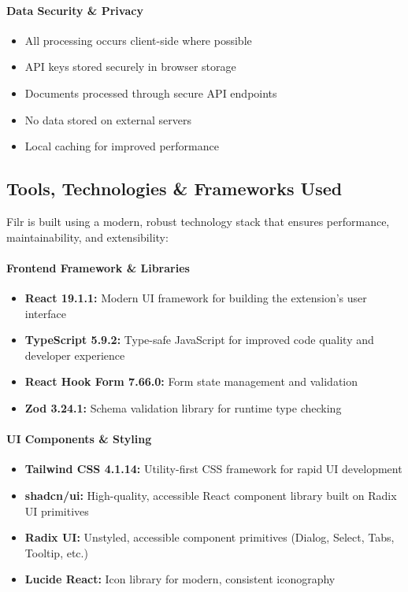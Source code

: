 \documentclass[11pt, a4paper]{article}
\theoremstyle{plain}
\theoremstyle{definition}
\begin{document}
\paragraph{Data Security \& Privacy}
\begin{itemize}
    \item All processing occurs client-side where possible
    \item API keys stored securely in browser storage
    \item Documents processed through secure API endpoints
    \item No data stored on external servers
    \item Local caching for improved performance
\end{itemize}

\subsection{Tools, Technologies \& Frameworks Used}

Filr is built using a modern, robust technology stack that ensures performance, maintainability, and extensibility:

\paragraph{Frontend Framework \& Libraries}
\begin{itemize}
    \item \textbf{React 19.1.1:} Modern UI framework for building the extension's user interface
    \item \textbf{TypeScript 5.9.2:} Type-safe JavaScript for improved code quality and developer experience
    \item \textbf{React Hook Form 7.66.0:} Form state management and validation
    \item \textbf{Zod 3.24.1:} Schema validation library for runtime type checking
\end{itemize}

\paragraph{UI Components \& Styling}
\begin{itemize}
    \item \textbf{Tailwind CSS 4.1.14:} Utility-first CSS framework for rapid UI development
    \item \textbf{shadcn/ui:} High-quality, accessible React component library built on Radix UI primitives
    \item \textbf{Radix UI:} Unstyled, accessible component primitives (Dialog, Select, Tabs, Tooltip, etc.)
    \item \textbf{Lucide React:} Icon library for modern, consistent iconography
\end{itemize}
\end{document}
